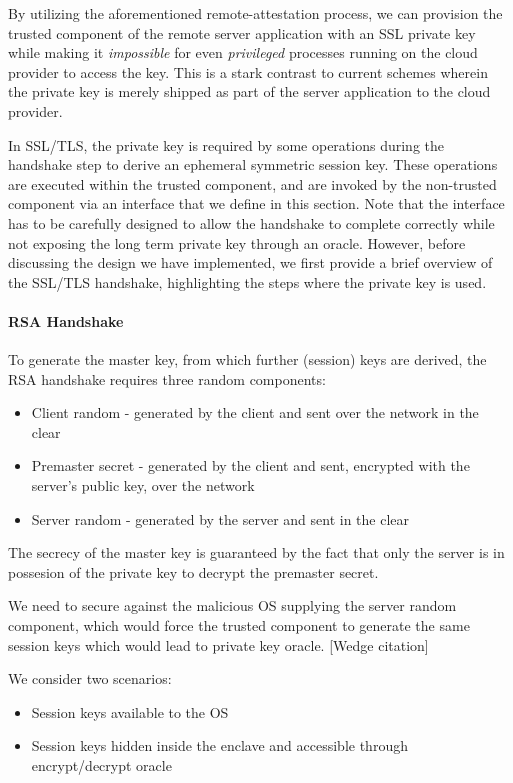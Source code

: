 \documentclass[../main.tex]{subfiles}
\begin{document}
	By utilizing the aforementioned remote-attestation process, we can provision the trusted component 
	of the remote server application with an SSL private key while making it \textit{impossible} for even
	\textit{privileged} processes running on the cloud provider to access the key. This is a stark contrast to current
	schemes wherein the private key is merely shipped as part of the server application to the cloud provider. 

	In SSL/TLS, the private key is required by some operations during the handshake step to derive an ephemeral symmetric session key. These operations
	are executed within the trusted component, and are invoked by the non-trusted component via an interface that we define in this section. Note that
	the interface has to be carefully designed to allow the handshake to complete correctly while not exposing the long term private key through an oracle.
	However, before discussing the design we have implemented, we first provide a brief overview of the SSL/TLS handshake, highlighting
	the steps where the private key is used.


	\paragraph{RSA Handshake}
	To generate the master key, from which further (session) keys
	are derived, the RSA handshake requires three random components:
	\begin{itemize}
		\item Client random - generated by the client and sent over the network in the clear
		\item Premaster secret - generated by the client and sent, encrypted with the server's public key, over the network
		\item Server random - generated by the server and sent in the clear
	\end{itemize}

The secrecy of the master key is guaranteed by the fact that only the server is in possesion of the private key to decrypt the premaster secret.

We need to secure against the malicious OS supplying the server random component, which would force the trusted component to generate the same session keys which would lead to private key oracle. [Wedge citation]


We consider two scenarios:
\begin{itemize}
	\item Session keys available to the OS
	\item Session keys hidden inside the enclave and accessible through encrypt/decrypt oracle
\end{itemize}
\end{document}
